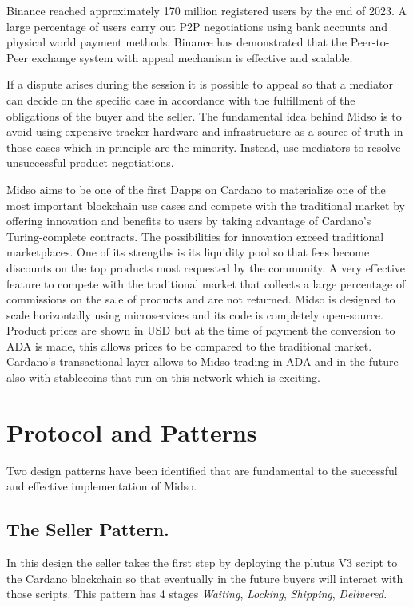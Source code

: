 \documentclass[12pt]{article}
\begin{document}
Binance reached approximately 170 million registered users by the end of 2023. A large percentage of users carry out P2P negotiations using bank accounts and physical world payment methods. Binance has demonstrated that the Peer-to-Peer exchange system with appeal mechanism is effective and scalable.

If a dispute arises during the session it is possible to appeal so that a mediator can decide on the specific case in accordance with the fulfillment of the obligations of the buyer and the seller. The fundamental idea behind Midso is to avoid using expensive tracker hardware and infrastructure as a source of truth in those cases which in principle are the minority. Instead, use mediators to resolve unsuccessful product negotiations.

Midso aims to be one of the first Dapps on Cardano to materialize one of the most important blockchain use cases and compete with the traditional market by offering innovation and benefits to users by taking advantage of Cardano's Turing-complete contracts. The possibilities for innovation exceed traditional marketplaces. One of its strengths is its liquidity pool so that fees become discounts on the top products most requested by the community. 
A very effective feature to compete with the traditional market that collects a large percentage of commissions on the sale of products and are not returned. Midso is designed to scale horizontally using microservices and its code is completely open-source.
Product prices are shown in USD but at the time of payment the conversion to ADA is made, this allows prices to be compared to the traditional market. Cardano's transactional layer allows to Midso trading in ADA and in the future also with \underline{stablecoins} that run on this network which is exciting.

\section{ Protocol and Patterns }

Two design patterns have been identified that are fundamental to the successful and effective implementation of Midso.

\subsection { The Seller Pattern. } 

In this design the seller takes the first step by deploying the plutus V3 script to the Cardano blockchain so that eventually in the future buyers will interact with those scripts. This pattern has 4 stages \emph{Waiting}, \emph{Locking}, \emph{Shipping}, \emph{Delivered}.
\end{document}
